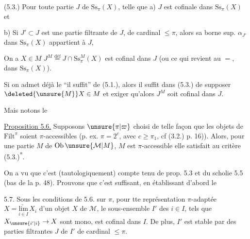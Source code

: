 (5.3.) Pour  toute partie $J$ de $\mathrm{Ss}_\pi(X)$, telle
que a) $J$ est cofinale dans $\mathrm{Ss}_\pi(X)$ et

b) Si  $J'\subset J$ est une partie filtrante
de $J$, de cardinal $\leq\pi$, alors sa borne
sup. $\alpha_{J'}$ dans $\mathrm{Ss}_\pi(X)$ appartient à $J$,

On a $X\in M$  $J^M\overset{\mathrm{déf}}{=}J\cap\mathrm{Ss}^{M}_\pi(X)$
est cofinal dans $J$ (ou ce qui revient
au $=$, dans $\mathrm{Ss}_\pi(X)$).

 Si on admet déjà  le ``il suffit'' de
(5.1.), alors il suffit dans (5.3.) de
supposer $\deleted{\unsure{M}}X\in M$ et exiger qu'alors
$J^M$ soit cofinal dans $J$.

Mais notons le


\uline{Proposition 5.6.} Supposons $\unsure{\pi|\varpi}$ choisi de telle façon
que les objets de $\mathrm{Filt}^{\pi}$ soient $\pi$-accessibles
(p. ex. $\pi=2^c$, avec $c\geq\pi_1$\deleted{\unsure{\}}}, cf (3.2.) p. 16)).
Alors, pour une partie $M$ de $\mathrm{Ob}\,\unsure{\mathcal M|M}$, $M$ est
$\pi$-accessible  elle satisfait au critère (5.3.)\textsuperscript{*}.

On a vu que c'est  (tautologiquement)\deleted{\unsure{,}}
compte tenu de prop. 5.3 et du scholie 5.5
(bas de la p. 48). Prouvons que c'est
suffisant, en établissant d'abord le

\uline{} 5.7. Sous les conditions de
5.6. sur $\pi$, 
pour tte représentation $\pi$-adaptée
$X=\underset{i\in I}{\underrightarrow{\mathrm{lim}}}\,X_i$ d'un objet $X$ de $\mathcal M$,
 le sous-ensemble $I'$  des
$i\in I$, tels que  $X_{\unsure{i'|i}}\to X$
sont mono, est cofinal dans $I$. De plus, $I'$ est stable par   des  parties filtrantes $J$ de $I'$ de cardinal $\leq\pi$.

